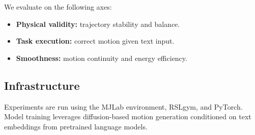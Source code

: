 \documentclass{article}
\begin{document}
We evaluate on the following axes:
\begin{itemize}
    \item \textbf{Physical validity:} trajectory stability and balance.
    \item \textbf{Task execution:} correct motion given text input.
    \item \textbf{Smoothness:} motion continuity and energy efficiency.
\end{itemize}

\subsection{Infrastructure}

Experiments are run using the MJLab environment, RSLgym, and PyTorch.
Model training leverages diffusion-based motion generation conditioned on text embeddings from pretrained language models.
% 

\clearpage
% 

\printbibliography
% 
% 
\end{document}
